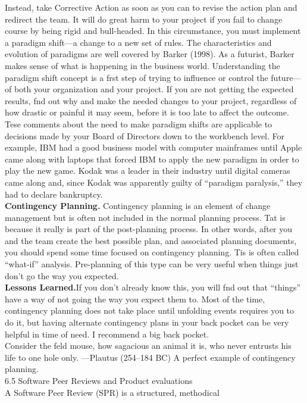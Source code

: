 \documentclass[twocolumn,a4paper,13pt]{book}
\begin{document}
Instead, take Corrective Action as soon as you can to
revise the action plan and redirect the team. It will do great harm to your project if you fail to change course by being rigid and bull-headed. In this circumstance, you must implement a paradigm shift—a change to a new set of rules.
The characteristics and evolution of paradigms are well
covered by Barker (1998). As a futurist, Barker makes sense of what is happening in the business world. Understanding the paradigm shift concept is a frst step of trying to inﬂuence or control the future—of both your organization and your project. If you are not getting the expected results, fnd out why and make the needed changes to your project, regardless of how drastic or painful it may seem, before it is too late to aﬀect the outcome.
Tese comments about the need to make paradigm shifts are
applicable to decisions made by your Board of Directors down to the workbench level. For example, IBM had a good business model with computer mainframes until Apple came along with laptops that forced IBM to apply the new paradigm in order to play the new game. Kodak was a leader in their industry until digital cameras came along and, since Kodak was apparently guilty of “paradigm paralysis,” they had to declare bankruptcy.\\\textbf{Contingency Planning.} Contingency planning is an element of change management but is often not included in the normal planning process. Tat is because it really is part of the post-planning process. In other words, after you and the team create the best possible plan, and associated planning documents, you should spend some time focused on contingency planning. Tis is often called “what-if” analysis. Pre-planning of this type can be very useful when things just don’t go the way you expected.\\\textbf{Lessons Learned.}If you don’t already know
this, you will fnd out that “things” have a way
of not going the way you expect them to. Most
of the time, contingency planning does not take
place until unfolding events requires you to do
it, but having alternate contingency plans in your
back pocket can be very helpful in time of need.
I recommend a big back pocket.\\Consider the feld mouse, how sagacious an animal
it is, who never entrusts his life to one hole only.
—Plautus (254–184 BC) A perfect example of
contingency planning.\\ \Large 6.5 Software Peer Reviews and Product evaluations\\\normalsize A Software Peer Review (SPR) is a structured, methodical
\end{document}
